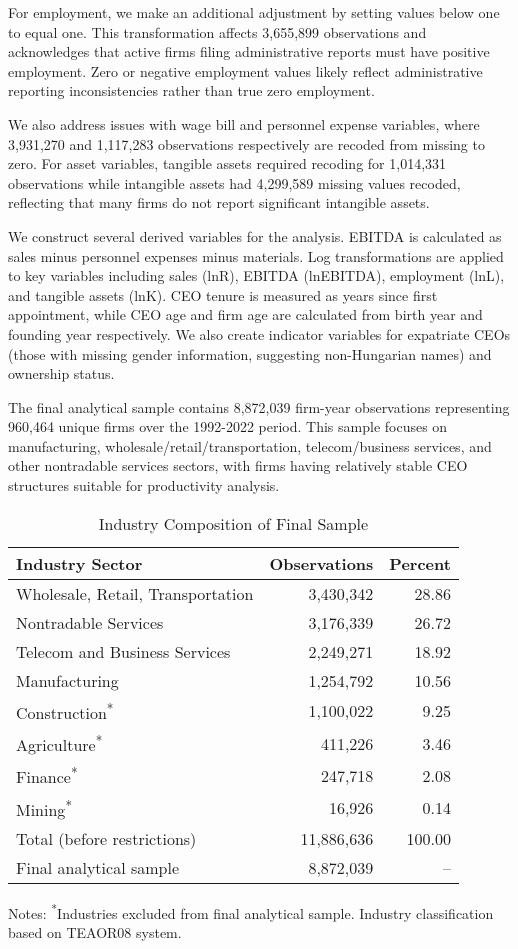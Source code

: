 \documentclass[11pt,a4paper]{article}
\begin{document}
For employment, we make an additional adjustment by setting values below one to equal one. This transformation affects 3,655,899 observations and acknowledges that active firms filing administrative reports must have positive employment. Zero or negative employment values likely reflect administrative reporting inconsistencies rather than true zero employment.

We also address issues with wage bill and personnel expense variables, where 3,931,270 and 1,117,283 observations respectively are recoded from missing to zero. For asset variables, tangible assets required recoding for 1,014,331 observations while intangible assets had 4,299,589 missing values recoded, reflecting that many firms do not report significant intangible assets.

We construct several derived variables for the analysis. EBITDA is calculated as sales minus personnel expenses minus materials. Log transformations are applied to key variables including sales (lnR), EBITDA (lnEBITDA), employment (lnL), and tangible assets (lnK). CEO tenure is measured as years since first appointment, while CEO age and firm age are calculated from birth year and founding year respectively. We also create indicator variables for expatriate CEOs (those with missing gender information, suggesting non-Hungarian names) and ownership status.

The final analytical sample contains 8,872,039 firm-year observations representing 960,464 unique firms over the 1992-2022 period. This sample focuses on manufacturing, wholesale/retail/transportation, telecom/business services, and other nontradable services sectors, with firms having relatively stable CEO structures suitable for productivity analysis.

\begin{table}[htbp]
\centering
\caption{Industry Composition of Final Sample}
\label{tab:industry}
\begin{tabular}{lrr}
\toprule
Industry Sector & Observations & Percent \\
\midrule
Wholesale, Retail, Transportation & 3,430,342 & 28.86 \\
Nontradable Services & 3,176,339 & 26.72 \\
Telecom and Business Services & 2,249,271 & 18.92 \\
Manufacturing & 1,254,792 & 10.56 \\
Construction\textsuperscript{*} & 1,100,022 & 9.25 \\
Agriculture\textsuperscript{*} & 411,226 & 3.46 \\
Finance\textsuperscript{*} & 247,718 & 2.08 \\
Mining\textsuperscript{*} & 16,926 & 0.14 \\
\midrule
Total (before restrictions) & 11,886,636 & 100.00 \\
Final analytical sample & 8,872,039 & -- \\
\bottomrule
\end{tabular}
\footnotesize
Notes: \textsuperscript{*}Industries excluded from final analytical sample. Industry classification based on TEAOR08 system.
\end{table}
\end{document}
